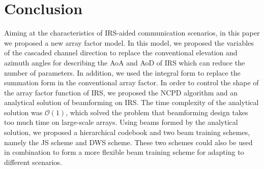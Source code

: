 \documentclass[12pt,draftclsnofoot,onecolumn]{IEEEtran}
\begin{document}
	
	
	
	
	
	\section{Conclusion}
	
	Aiming at the characteristics of IRS-aided communication scenarios, in this paper we proposed a new array factor model. In this model, we proposed the variables of the cascaded channel direction  to replace the conventional elevation and azimuth angles for describing the AoA and AoD of  IRS which can reduce the number of parameters. In addition, we used the integral form to replace the summation form in the conventional array factor. 
	In order to  control the shape of the array factor function  of IRS, we proposed the NCPD algorithm and an analytical solution of beamforming on IRS.  The  time complexity of the analytical solution  was $\mathcal{O}(1)$, which solved the problem that beamforming design takes too much time on large-scale arrays. 
	Using beams formed by the analytical solution, we proposed a hierarchical codebook and two beam training schemes,  namely the  JS scheme and  DWS scheme.  These two schemes could also be used in combination to form a more flexible beam training scheme for adapting to different scenarios. 
	
\end{document}
